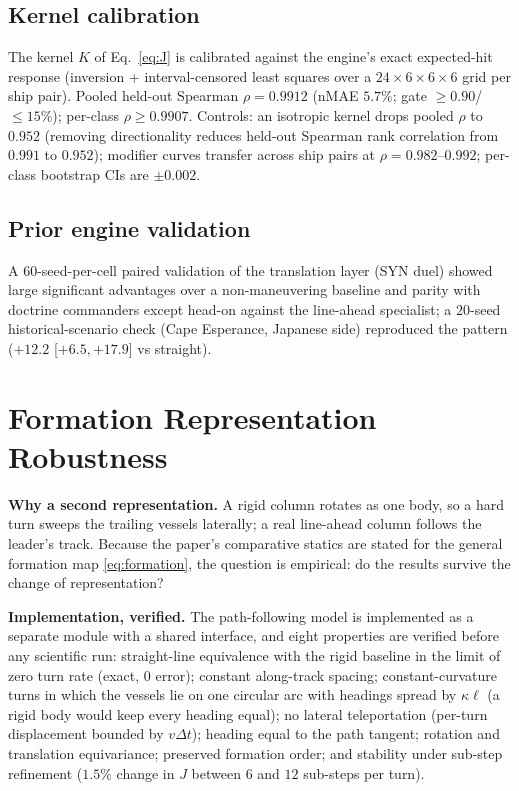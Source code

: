 \documentclass[12pt,a4paper]{article}
\begin{document}
\subsection{Kernel calibration}\label{sec:kernel}
The kernel $K$ of Eq.~\eqref{eq:J} is calibrated against the engine's exact
expected-hit response (inversion + interval-censored least squares over a
$24\times6\times6\times6$ grid per ship pair).  Pooled held-out Spearman
$\rho=0.9912$ (nMAE $5.7\%$; gate $\ge0.90$/$\le15\%$); per-class
$\rho\ge0.9907$.  Controls: an isotropic kernel drops pooled $\rho$ to
$0.952$ (removing directionality reduces held-out Spearman rank
correlation from $0.991$ to $0.952$);
modifier curves transfer across ship pairs at $\rho=0.982$--$0.992$;
per-class bootstrap CIs are $\pm0.002$.

\subsection{Prior engine validation}
A $60$-seed-per-cell paired validation of the translation layer (SYN
duel) showed large significant advantages over a non-maneuvering baseline
and parity with doctrine commanders except head-on against the
line-ahead specialist; a $20$-seed historical-scenario check (Cape
Esperance, Japanese side) reproduced the pattern ($+12.2$ [$+6.5,+17.9$]
vs straight).

\section{Formation Representation Robustness}\label{sec:formation-robustness}

\noindent\textbf{Why a second representation.}  A rigid column rotates as one
body, so a hard turn sweeps the trailing vessels laterally; a real line-ahead
column follows the leader's track.  Because the paper's comparative statics
are stated for the general formation map \eqref{eq:formation}, the question is
empirical: do the results survive the change of representation?

\noindent\textbf{Implementation, verified.}  The path-following model is
implemented as a separate module with a shared interface, and eight
properties are verified before any scientific run: straight-line equivalence
with the rigid baseline in the limit of zero turn rate (exact, $0$ error);
constant along-track spacing; constant-curvature turns in which the vessels
lie on one circular arc with headings spread by $\kappa\ell$ (a rigid body
would keep every heading equal); no lateral teleportation (per-turn
displacement bounded by $v\Delta t$); heading equal to the path tangent;
rotation and translation equivariance; preserved formation order; and
stability under sub-step refinement ($1.5\%$ change in $J$ between $6$ and
$12$ sub-steps per turn).
\end{document}
